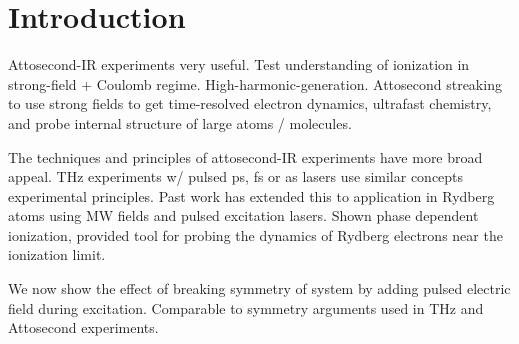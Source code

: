 \documentclass[aps,pra,preprint,groupedaddress]{revtex4-1}
\begin{document}
\maketitle


\section{\label{intro}Introduction}

Attosecond-IR experiments very useful. Test understanding of ionization in strong-field + Coulomb regime. High-harmonic-generation. Attosecond streaking to use strong fields to get time-resolved electron dynamics, ultrafast chemistry, and probe internal structure of large atoms / molecules.

The techniques and principles of attosecond-IR experiments have more broad appeal. THz experiments w/ pulsed ps, fs or as lasers use similar concepts experimental principles. Past work has extended this to application in Rydberg atoms using MW fields and pulsed excitation lasers. Shown phase dependent ionization, provided tool for probing the dynamics of Rydberg electrons near the ionization limit.

We now show the effect of breaking symmetry of system by adding pulsed electric field during excitation. Comparable to symmetry arguments used in THz and Attosecond experiments.
\end{document}

